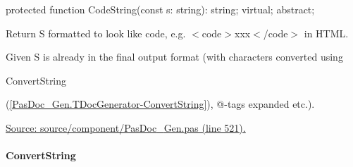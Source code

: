 \documentclass{report}
\newif\ifpdf
\begin{document}
\label{PasDoc_Gen.TDocGenerator-CodeString}
\begin{list}{}{
\setlength{\itemindent}{0cm}
\setlength{\listparindent}{0cm}
\setlength{\leftmargin}{\evensidemargin}
\addtolength{\leftmargin}{\tmplength}
\settowidth{\labelsep}{X}
\addtolength{\leftmargin}{\labelsep}
\setlength{\labelwidth}{\tmplength}
}
\item[\textbf{Declaration}\hfill]
\ifpdf
\begin{flushleft}
\fi
\begin{ttfamily}
protected function CodeString(const s: string): string; virtual; abstract;\end{ttfamily}

\ifpdf
\end{flushleft}
\fi

\par
\item[\textbf{Description}]
Return S formatted to look like code, e.g. {$<$}code{$>$}xxx{$<$}/code{$>$} in HTML.

Given S is already in the final output format (with characters converted using \begin{ttfamily}ConvertString\end{ttfamily}(\ref{PasDoc_Gen.TDocGenerator-ConvertString}), @{-}tags expanded etc.).\par
\href{https://github.com/pasdoc/pasdoc/blob/master/source/component/PasDoc_Gen.pas#L521}{Source: source/component/PasDoc{\_}Gen.pas (line 521).}

\end{list}
\paragraph*{ConvertString}\hspace*{\fill}
\end{document}
